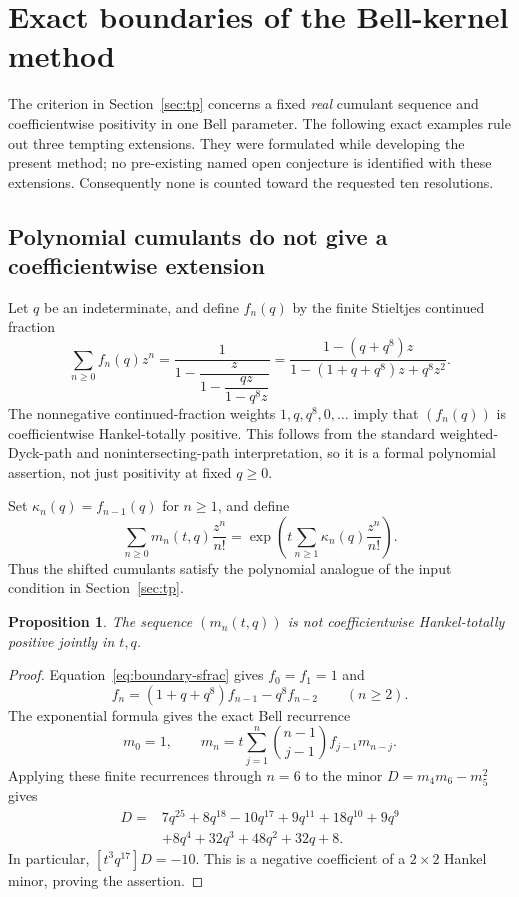 \documentclass[11pt,a4paper]{article}
\newtheorem{proposition}[theorem]{Proposition}
\theoremstyle{definition}
\theoremstyle{remark}
\numberwithin{equation}{section}
\begin{document}
\section{Exact boundaries of the Bell-kernel method}
\label{app:boundaries}

The criterion in Section~\ref{sec:tp} concerns a fixed \emph{real}
cumulant sequence and coefficientwise positivity in one Bell parameter.
The following exact examples rule out three tempting extensions. They
were formulated while developing the present method; no pre-existing
named open conjecture is identified with these extensions. Consequently
none is counted toward the requested ten resolutions.

\subsection{Polynomial cumulants do not give a coefficientwise extension}

Let $q$ be an indeterminate, and define $f_n(q)$ by the finite Stieltjes
continued fraction
\begin{equation}\label{eq:boundary-sfrac}
 \sum_{n\ge0}f_n(q)z^n
 =\frac{1}{1-\dfrac{z}{1-\dfrac{qz}{1-q^8z}}}
 =\frac{1-(q+q^8)z}{1-(1+q+q^8)z+q^8z^2}.
\end{equation}
The nonnegative continued-fraction weights $1,q,q^8,0,\ldots$ imply
that $(f_n(q))$ is coefficientwise Hankel-totally positive. This follows
from the standard weighted-Dyck-path and nonintersecting-path
interpretation, so it is a formal polynomial assertion, not just
positivity at fixed $q\ge0$.

Set $\kappa_n(q)=f_{n-1}(q)$ for $n\ge1$, and define
\[
 \sum_{n\ge0}m_n(t,q)\frac{z^n}{n!}
 =\exp\left(t\sum_{n\ge1}\kappa_n(q)\frac{z^n}{n!}\right).
\]
Thus the shifted cumulants satisfy the polynomial analogue of the input
condition in Section~\ref{sec:tp}.

\begin{proposition}
The sequence $(m_n(t,q))$ is not coefficientwise Hankel-totally positive
jointly in $t,q$.
\end{proposition}
\begin{proof}
Equation~\eqref{eq:boundary-sfrac} gives $f_0=f_1=1$ and
\[
 f_n=(1+q+q^8)f_{n-1}-q^8f_{n-2}\qquad(n\ge2).
\]
The exponential formula gives the exact Bell recurrence
\[
 m_0=1,\qquad
 m_n=t\sum_{j=1}^{n}\binom{n-1}{j-1}f_{j-1}m_{n-j}.
\]
Applying these finite recurrences through $n=6$ to the minor
$D=m_4m_6-m_5^2$ gives
\begin{align*}
 [t^3]D={}&7q^{25}+8q^{18}-10q^{17}+9q^{11}+18q^{10}+9q^9\\
          &+8q^4+32q^3+48q^2+32q+8.
\end{align*}
In particular, $[t^3q^{17}]D=-10$. This is a negative coefficient of a
$2\times2$ Hankel minor, proving the assertion.
\end{proof}
\end{document}
